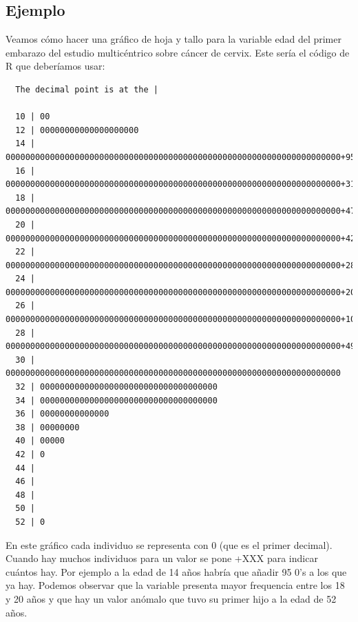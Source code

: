 \documentclass[
]{book}
\newenvironment{Shaded}{\begin{snugshade}}{\end{snugshade}}
\newcommand{\FunctionTok}[1]{\textcolor[rgb]{0.00,0.00,0.00}{#1}}
\newcommand{\NormalTok}[1]{#1}
\newcommand{\OtherTok}[1]{\textcolor[rgb]{0.56,0.35,0.01}{#1}}
\newcommand{\SpecialCharTok}[1]{\textcolor[rgb]{0.00,0.00,0.00}{#1}}
\newcommand{\StringTok}[1]{\textcolor[rgb]{0.31,0.60,0.02}{#1}}
\begin{document}
\hypertarget{ejemplo-6}{%
\subsection*{Ejemplo}\label{ejemplo-6}}

Veamos cómo hacer una gráfico de hoja y tallo para la variable edad del primer embarazo del estudio multicéntrico sobre cáncer de cervix. Este sería el código de R que deberíamos usar:

\begin{Shaded}
\end{Shaded}

\begin{verbatim}
  The decimal point is at the |

  10 | 00
  12 | 00000000000000000000
  14 | 00000000000000000000000000000000000000000000000000000000000000000000+95
  16 | 00000000000000000000000000000000000000000000000000000000000000000000+317
  18 | 00000000000000000000000000000000000000000000000000000000000000000000+479
  20 | 00000000000000000000000000000000000000000000000000000000000000000000+420
  22 | 00000000000000000000000000000000000000000000000000000000000000000000+289
  24 | 00000000000000000000000000000000000000000000000000000000000000000000+200
  26 | 00000000000000000000000000000000000000000000000000000000000000000000+105
  28 | 00000000000000000000000000000000000000000000000000000000000000000000+49
  30 | 00000000000000000000000000000000000000000000000000000000000000000000
  32 | 000000000000000000000000000000000000
  34 | 000000000000000000000000000000000000
  36 | 00000000000000
  38 | 00000000
  40 | 00000
  42 | 0
  44 | 
  46 | 
  48 | 
  50 | 
  52 | 0
\end{verbatim}

En este gráfico cada individuo se representa con 0 (que es el primer decimal). Cuando hay muchos individuos para un valor se pone +XXX para indicar cuántos hay. Por ejemplo a la edad de 14 años habría que añadir 95 0's a los que ya hay. Podemos observar que la variable presenta mayor frequencia entre los 18 y 20 años y que hay un valor anómalo que tuvo su primer hijo a la edad de 52 años.
\end{document}

